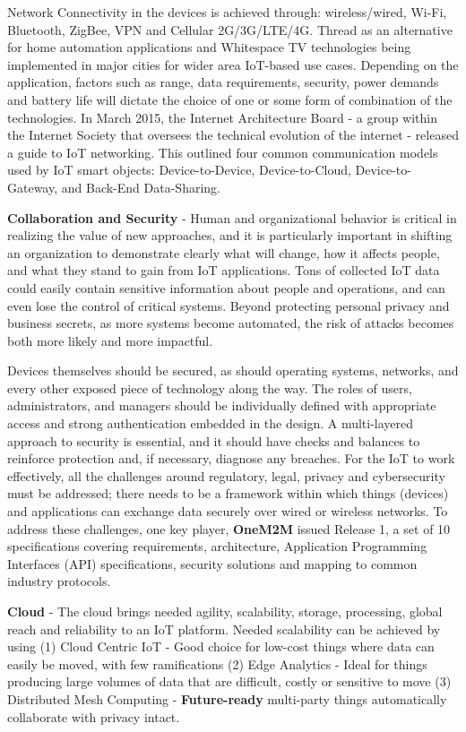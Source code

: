 \documentclass[sigconf]{acmart}
\begin{document}
Network Connectivity in the devices is achieved through: wireless/wired, Wi-Fi, Bluetooth, ZigBee, VPN and Cellular 2G/3G/LTE/4G. Thread as an alternative for home automation applications and Whitespace TV technologies being implemented in major cities for wider area IoT-based use cases. Depending on the application, factors such as range, data requirements, security, power demands and battery life will dictate the choice of one or some form of combination of the technologies. In March 2015, the Internet Architecture Board - a group within the Internet Society that oversees the technical evolution of the internet - released a guide to IoT networking. This outlined four common communication models used by IoT smart objects: Device-to-Device, Device-to-Cloud, Device-to-Gateway, and Back-End Data-Sharing\cite{Internet_Society}.

\textbf{Collaboration and Security} - Human and organizational behavior is critical in realizing the value of new approaches, and it is particularly important in shifting an organization to demonstrate clearly what will change, how it affects people, and what they stand to gain from IoT applications. Tons of collected IoT data could easily contain sensitive information about people and operations, and can even lose the control of critical systems. Beyond protecting personal privacy and business secrets, as more systems become automated, the risk of attacks becomes both more likely and more impactful. 

Devices themselves should be secured, as should operating systems, networks, and every other exposed piece of technology along the way. The roles of users, administrators, and managers should be individually defined with appropriate access and strong authentication embedded in the design. A multi-layered approach to security is essential, and it should have checks and balances to reinforce protection and, if necessary, diagnose any breaches. For the IoT to work effectively, all the challenges around regulatory, legal, privacy and cybersecurity must be addressed; there needs to be a framework within which things (devices) and applications can exchange data securely over wired or wireless networks. To address these challenges, one key player, \textbf{OneM2M} issued Release 1, a set of 10 specifications covering requirements, architecture, Application Programming Interfaces (API) specifications, security solutions and mapping to common industry protocols\cite{OneM2M}.

\textbf{Cloud} - The cloud brings needed agility, scalability, storage, processing, global reach and reliability to an IoT platform. Needed scalability can be achieved by using (1) Cloud Centric IoT - Good choice for low-cost things where data can easily be moved, with few ramifications (2) Edge Analytics - Ideal for things producing large volumes of data that are difficult, costly or sensitive to move (3) Distributed Mesh Computing - \textbf{Future-ready} multi-party things automatically collaborate with privacy intact. 
\end{document}
